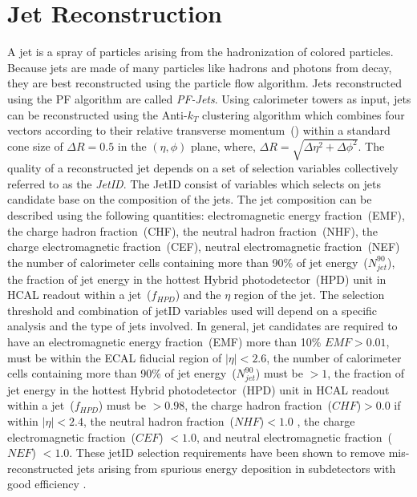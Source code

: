 \section{Jet Reconstruction}
A jet is a spray of particles arising from the hadronization of colored particles. 
Because jets are made of many particles like hadrons and photons from \Ppizero decay, they are best reconstructed using the particle flow algorithm.
Jets reconstructed using the PF algorithm are called \textit{PF-Jets}. 
\newline
Using calorimeter towers as input, jets can be reconstructed using the Anti-$k_{T}$ clustering algorithm which combines four vectors according to their relative transverse momentum~(\pt) within a standard cone size of $\Delta R = 0.5$ in the $(\eta, \phi)$ plane, where, $\Delta R = \sqrt{ \Delta\eta^{2} + \Delta\phi^{2} }$.
\newline 
The quality of a reconstructed jet depends on a set of selection variables collectively referred to as the \textit{JetID}. The JetID consist of variables which selects on jets candidate base on the composition of the jets. The jet composition can be described using the following quantities: electromagnetic energy fraction~(EMF), the charge  hadron fraction~(CHF), the neutral hadron fraction~(NHF), the charge electromagnetic fraction~(CEF),  neutral electromagnetic fraction~(NEF) the number of calorimeter cells containing more than 90\% of jet energy~($N^{90}_{jet}$), the fraction of jet energy in the hottest  Hybrid photodetector~(HPD) unit in HCAL readout within a jet~($f_{HPD}$) and the $\eta$ region of the jet. The selection threshold and combination of jetID variables used  will depend on a specific analysis and the type of jets involved.
In general, jet candidates are required to have an electromagnetic energy fraction~(EMF) more than 10\% \ie $EMF > 0.01$,  must be within the ECAL fiducial region of $|\eta| < 2.6$, the number of calorimeter cells containing more than 90\% of jet energy~($N^{90}_{jet}$) must be $ > 1$, the fraction of jet energy in the hottest  Hybrid photodetector~(HPD) unit  in HCAL readout within a jet~($f_{HPD}$) must be $ > 0.98$, the charge  hadron fraction~($CHF$)$ >0.0$ if within $|\eta| < 2.4$, the neutral hadron fraction~($NHF$)$ < 1.0$ , the charge electromagnetic fraction~($CEF$) $ < 1.0$, and neutral electromagnetic fraction~($NEF$) $< 1.0 $.
These jetID selection requirements have been shown to remove mis-reconstructed jets arising from spurious energy deposition in subdetectors with good efficiency \cite{JET}.
